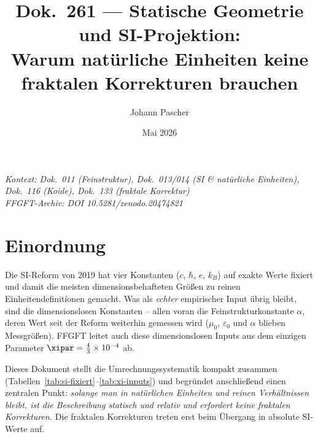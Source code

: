 
\title{Dok.~261 — Statische Geometrie und SI-Projektion:\\
Warum natürliche Einheiten keine fraktalen Korrekturen brauchen}
\author{Johann Pascher}
\date{Mai 2026}
\maketitle

\begin{center}
\textit{Kontext: Dok.~011 (Feinstruktur), Dok.~013/014 (SI \& natürliche Einheiten),
Dok.~116 (Koide), Dok.~133 (fraktale Korrektur)} \\[2pt]
\textit{FFGFT-Archiv: DOI 10.5281/zenodo.20474821}
\end{center}

\tableofcontents
\newpage

\section{Einordnung}

Die SI-Reform von 2019 hat vier Konstanten ($c$, $\hbar$, $e$, $k_B$) auf exakte
Werte fixiert und damit die meisten dimensionsbehafteten Größen zu reinen
Einheitendefinitionen gemacht. Was als \emph{echter} empirischer Input übrig
bleibt, sind die dimensionslosen Konstanten -- allen voran die
Feinstrukturkonstante $\alpha$, deren Wert seit der Reform weiterhin gemessen
wird ($\mu_0$, $\varepsilon_0$ und $\alpha$ blieben Messgrößen). FFGFT leitet
auch diese dimensionslosen Inputs aus dem einzigen Parameter
$\xipar = \tfrac{4}{3}\times 10^{-4}$ ab.

Dieses Dokument stellt die Umrechnungssystematik kompakt zusammen
(Tabellen~\ref{tab:si-fixiert}--\ref{tab:xi-inputs}) und begründet anschließend
einen zentralen Punkt: \emph{solange man in natürlichen Einheiten und reinen
Verhältnissen bleibt, ist die Beschreibung statisch und relativ und erfordert
keine fraktalen Korrekturen.} Die fraktalen Korrekturen treten erst beim Übergang
in absolute SI-Werte auf.

